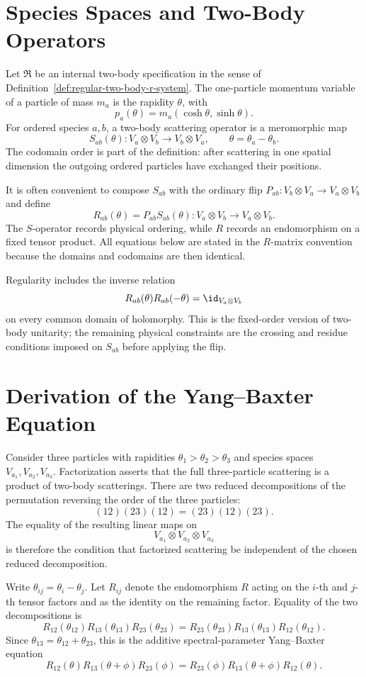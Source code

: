 \section{Species Spaces and Two-Body Operators}

Let \(\mathfrak R\) be an internal two-body specification in the sense of
Definition~\ref{def:regular-two-body-r-system}.  The one-particle momentum
variable of a particle of mass \(m_a\) is the rapidity \(\theta\), with
\[
  p_a(\theta)=m_a(\cosh\theta,\sinh\theta).
\]
For ordered species \(a,b\), a two-body scattering operator is a meromorphic
map
\[
  S_{ab}(\theta):V_a\otimes V_b\longrightarrow V_b\otimes V_a,
  \qquad \theta=\theta_a-\theta_b .
\]
The codomain order is part of the definition: after scattering in one spatial
dimension the outgoing ordered particles have exchanged their positions.

It is often convenient to compose \(S_{ab}\) with the ordinary flip
\(P_{ab}:V_b\otimes V_a\to V_a\otimes V_b\) and define
\[
  R_{ab}(\theta)=P_{ab}S_{ab}(\theta):
  V_a\otimes V_b\longrightarrow V_a\otimes V_b .
\]
The \(S\)-operator records physical ordering, while \(R\) records an
endomorphism on a fixed tensor product.  All equations below are stated in the
\(R\)-matrix convention because the domains and codomains are then identical.

Regularity includes the inverse relation
\[
  R_{ab}(\theta)R_{ab}(-\theta)=\id_{V_a\otimes V_b}
\]
on every common domain of holomorphy.  This is the fixed-order version of
two-body unitarity; the remaining physical constraints are the crossing and
residue conditions imposed on \(S_{ab}\) before applying the flip.

\section{Derivation of the Yang--Baxter Equation}

Consider three particles with rapidities
\(\theta_1>\theta_2>\theta_3\) and species spaces
\(V_{a_1},V_{a_2},V_{a_3}\).  Factorization asserts that the full
three-particle scattering is a product of two-body scatterings.  There are two
reduced decompositions of the permutation reversing the order of the three
particles:
\[
  (12)(23)(12)=(23)(12)(23).
\]
The equality of the resulting linear maps on
\[
  V_{a_1}\otimes V_{a_2}\otimes V_{a_3}
\]
is therefore the condition that factorized scattering be independent of the
chosen reduced decomposition.

Write \(\theta_{ij}=\theta_i-\theta_j\).  Let \(R_{ij}\) denote the
endomorphism \(R\) acting on the \(i\)-th and \(j\)-th tensor factors and as
the identity on the remaining factor.  Equality of the two decompositions is
\[
  R_{12}(\theta_{12})R_{13}(\theta_{13})R_{23}(\theta_{23})
  =
  R_{23}(\theta_{23})R_{13}(\theta_{13})R_{12}(\theta_{12}).
\]
Since \(\theta_{13}=\theta_{12}+\theta_{23}\), this is the additive
spectral-parameter Yang--Baxter equation
\begin{equation}
\label{eq:additive-ybe}
  R_{12}(\theta)R_{13}(\theta+\phi)R_{23}(\phi)
  =
  R_{23}(\phi)R_{13}(\theta+\phi)R_{12}(\theta).
\end{equation}

